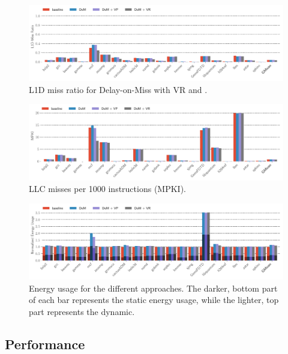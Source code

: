 \begin{figure}[t]
  \includegraphics[width=\textwidth]{figs/l1d_miss_ratio.pdf}
  \caption{L1D miss ratio for Delay-on-Miss with VR and \recomp.}
  \label{fig:l1d_misses}
\end{figure}

\begin{figure}[t]
  \includegraphics[width=\textwidth]{figs/mpki.pdf}
  \caption{LLC misses per 1000 instructions (MPKI).}
  \label{fig:mpki}
\end{figure}

\begin{figure}[t]
  \includegraphics[width=\textwidth]{figs/normalized_energy_usage.pdf}
  \caption{Energy usage for the different approaches. The darker, bottom part of each bar represents the static energy usage, while the lighter, top part represents the dynamic.}
  \label{fig:energy}
\end{figure}

\subsection{Performance}
\label{sec:performance}

